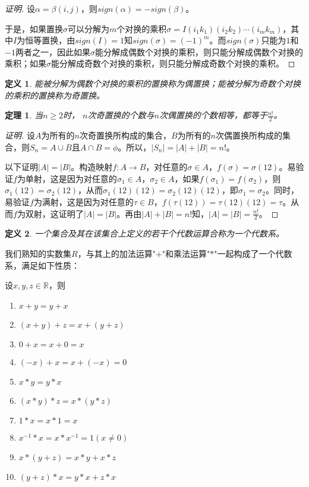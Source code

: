 \documentclass{article}
\newtheorem{Def}{定义}
\newtheorem{Thm}{定理}
\begin{document}
\begin{CJK*}{UTF8}{gbsn}
\begin{proof}[证明]
设$\alpha = \beta (i,j)$，则$sign(\alpha) = -sign(\beta)$。

于是，如果置换$\sigma$可以分解为$m$个对换的乘积$\sigma = I(i_1k_1)(i_2k_2)\cdots (i_mk_m)$，其中$I$为恒等置换，由$sign(I)=1$知$sign(\sigma) = (-1)^m$。而$sign(\sigma)$只能为$1$和$-1$两者之一，因此如果$\sigma$能分解成偶数个对换的乘积，则只能分解成偶数个对换的乘积；如果$\sigma$能分解成奇数个对换的乘积，则只能分解成奇数个对换的乘积。
  \end{proof}
  \begin{Def}
    能被分解为偶数个对换的乘积的置换称为偶置换；能被分解为奇数个对换的乘积的置换称为奇置换。
  \end{Def}
    \begin{Thm}
    当$n \geq 2$时， $n$次奇置换的个数与$n$次偶置换的个数相等，都等于$\frac{n!}{2}$。
  \end{Thm}
     \begin{proof}[证明]
     设$A$为所有的$n$次奇置换所构成的集合，$B$为所有的$n$次偶置换所构成的集合，则$S_n=A\cup B$且$A\cap B=\phi$。所以，$|S_n|=|A| + |B|=n!$。

     以下证明$|A|=|B|$。构造映射$f:A\to B$，对任意的$\sigma\in A$，$f(\sigma) = \sigma(12)$。易验证$f$为单射，这是因为对任意的$\sigma_1\in A$，$\sigma_2\in A$，如果$f(\sigma_1)=f(\sigma_2)$，则$\sigma_1(12)=\sigma_2(12)$，从而$\sigma_1(12)(12)=\sigma_2(12)(12)$，即$\sigma_1=\sigma_2$。同时，易验证$f$为满射，这是因为对任意的$\tau \in B$，$f(\tau(12))=\tau(12)(12)=\tau$。从而$f$为双射，这证明了$|A|=|B|$。再由$|A|+|B|=n!$知，$|A|=|B|=\frac{n!}{2}$。
   \end{proof}

      \begin{Def}
    一个集合及其在该集合上定义的若干个代数运算合称为一个代数系。
  \end{Def}
  我们熟知的实数集$R$，与其上的加法运算"$+$"和乘法运算"$*$"一起构成了一个代数系，满足如下性质：
  
    设$x, y, z \in \mathbb{R}$，则
   \begin{enumerate}
   \item   $x + y = y + x$
   \item   $(x + y) + z = x + (y + z)$
   \item   $0 + x = x + 0 = x$
   \item   $(-x) + x =x + (-x) = 0$
   \item   $x * y = y * x$
   \item   $(x * y) * z = x * (y *z)$
   \item   $1 * x = x * 1 = x$
   \item   $x^{-1} * x = x * x^{-1} = 1 (x \neq 0)$
   \item   $x* (y + z) = x * y + x * z$
   \item   $(y + z) * x = y * x + z * x$
    \end{enumerate}


\end{CJK*}
\end{document}
